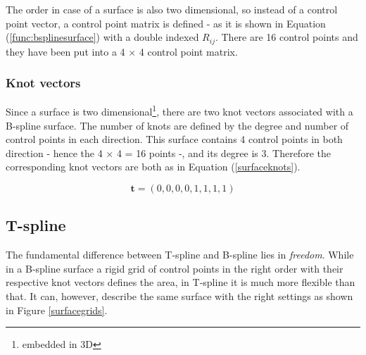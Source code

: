 \documentclass{article}
\begin{document}
The order in case of a surface is also two dimensional, so instead of a control point vector, a control point matrix is defined - as it is shown in Equation (\ref{func:bsplinesurface}) with a double indexed $R_{ij}$. There are 16 control points and they have been put into a 4 $\times$ 4 control point matrix.

\subsubsection{Knot vectors}

\vspace{6pt}
Since a surface is two dimensional\footnote{embedded in 3D}, there are two knot vectors associated with a B-spline surface. The number of knots are defined by the degree and number of control points in each direction. This surface contains 4 control points in both direction - hence the 4 $\times$ 4 = 16 points -, and its degree is 3. Therefore the corresponding knot vectors are both as in Equation (\ref{surfaceknots}).

\begin{equation}
\mathbf{t} = (0, 0, 0, 0, 1, 1, 1, 1)
\label{surfaceknots}
\end{equation}

\subsection{T-spline}

\vspace{6pt}

The fundamental difference between T-spline and B-spline lies in \emph{freedom}. While in a B-spline surface a rigid grid of control points in the right order with their respective knot vectors defines the area, in T-spline it is much more flexible than that. It can, however, describe the same surface with the right settings as shown in Figure \ref{surfacegrids}.
\end{document}
